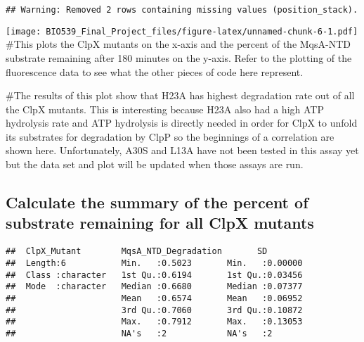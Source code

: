\documentclass[]{article}
\newenvironment{Shaded}{\begin{snugshade}}{\end{snugshade}}
\newcommand{\DecValTok}[1]{\textcolor[rgb]{0.00,0.00,0.81}{#1}}
\newcommand{\KeywordTok}[1]{\textcolor[rgb]{0.13,0.29,0.53}{\textbf{#1}}}
\newcommand{\NormalTok}[1]{#1}
\newcommand{\OperatorTok}[1]{\textcolor[rgb]{0.81,0.36,0.00}{\textbf{#1}}}
\newcommand{\StringTok}[1]{\textcolor[rgb]{0.31,0.60,0.02}{#1}}
\begin{document}
\begin{verbatim}
## Warning: Removed 2 rows containing missing values (position_stack).
\end{verbatim}

\texttt{[image: BIO539\_Final\_Project\_files/figure-latex/unnamed-chunk-6-1.pdf]}
\#This plots the ClpX mutants on the x-axis and the percent of the
MqsA-NTD substrate remaining after 180 minutes on the y-axis. Refer to
the plotting of the fluorescence data to see what the other pieces of
code here represent.

\#The results of this plot show that H23A has highest degradation rate
out of all the ClpX mutants. This is interesting because H23A also had a
high ATP hydrolysis rate and ATP hydrolysis is directly needed in order
for ClpX to unfold its substrates for degradation by ClpP so the
beginnings of a correlation are shown here. Unfortunately, A30S and L13A
have not been tested in this assay yet but the data set and plot will be
updated when those assays are run.

\hypertarget{calculate-the-summary-of-the-percent-of-substrate-remaining-for-all-clpx-mutants}{%
\subsection{Calculate the summary of the percent of substrate remaining
for all ClpX
mutants}\label{calculate-the-summary-of-the-percent-of-substrate-remaining-for-all-clpx-mutants}}

\begin{Shaded}
\end{Shaded}

\begin{verbatim}
##  ClpX_Mutant        MqsA_NTD_Degradation       SD         
##  Length:6           Min.   :0.5023       Min.   :0.00000  
##  Class :character   1st Qu.:0.6194       1st Qu.:0.03456  
##  Mode  :character   Median :0.6680       Median :0.07377  
##                     Mean   :0.6574       Mean   :0.06952  
##                     3rd Qu.:0.7060       3rd Qu.:0.10872  
##                     Max.   :0.7912       Max.   :0.13053  
##                     NA's   :2            NA's   :2
\end{verbatim}
\end{document}
